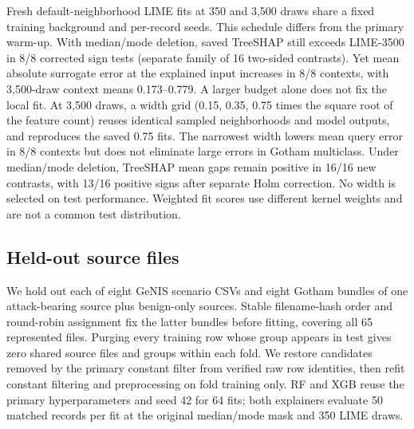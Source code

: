 \documentclass[conference,letterpaper]{IEEEtran}
\begin{document}
Fresh default-neighborhood LIME fits at 350 and 3,500 draws share a fixed training background and per-record seeds. This schedule differs from the primary warm-up. With median/mode deletion, saved TreeSHAP still exceeds LIME-3500 in 8/8 corrected sign tests (separate family of 16 two-sided contrasts). Yet mean absolute surrogate error at the explained input increases in 8/8 contexts, with 3,500-draw context means 0.173--0.779. A larger budget alone does not fix the local fit. At 3,500 draws, a width grid (0.15, 0.35, 0.75 times the square root of the feature count) reuses identical sampled neighborhoods and model outputs, and reproduces the saved 0.75 fits. The narrowest width lowers mean query error in 8/8 contexts but does not eliminate large errors in Gotham multiclass. Under median/mode deletion, TreeSHAP mean gaps remain positive in 16/16 new contrasts, with 13/16 positive signs after separate Holm correction. No width is selected on test performance. Weighted fit scores use different kernel weights and are not a common test distribution.

\subsection{Held-out source files}
We hold out each of eight GeNIS scenario CSVs and eight Gotham bundles of one attack-bearing source plus benign-only sources. Stable filename-hash order and round-robin assignment fix the latter bundles before fitting, covering all 65 represented files. Purging every training row whose group appears in test gives zero shared source files and groups within each fold. We restore candidates removed by the primary constant filter from verified raw row identities, then refit constant filtering and preprocessing on fold training only. RF and XGB reuse the primary hyperparameters and seed 42 for 64 fits; both explainers evaluate 50 matched records per fit at the original median/mode mask and 350 LIME draws.
\end{document}
